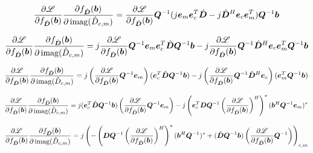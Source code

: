 \begin{appendices}
\begin{equation}
\frac{\partial \mathscr{L}}{\partial f_{\hat{\bm{D}}}(\bm{b})}\frac{\partial f_{\hat{\bm{D}}}(\bm{b})}{\partial \operatorname{imag}(\hat{D}_{c,m})} = \frac{\partial \mathscr{L}}{\partial f_{\hat{\bm{D}}}(\bm{b})}\bm{Q}^{-1}(j\bm{e}_m\bm{e}_c^T\hat{\bm{D}} - j\hat{\bm{D}}^H\bm{e}_c\bm{e}_m^T)\bm{Q}^{-1}\bm{b}
\end{equation}

\begin{equation}
\frac{\partial \mathscr{L}}{\partial f_{\hat{\bm{D}}}(\bm{b})}\frac{\partial f_{\hat{\bm{D}}}(\bm{b})}{\partial \operatorname{imag}(\hat{D}_{c,m})} = j\frac{\partial \mathscr{L}}{\partial f_{\hat{\bm{D}}}(\bm{b})}\bm{Q}^{-1}\bm{e}_m\bm{e}_c^T\hat{\bm{D}}\bm{Q}^{-1}\bm{b} - j\frac{\partial \mathscr{L}}{\partial f_{\hat{\bm{D}}}(\bm{b})}\bm{Q}^{-1}\hat{\bm{D}}^H\bm{e}_c\bm{e}_m^T\bm{Q}^{-1}\bm{b}
\end{equation}

\begin{equation}
\frac{\partial \mathscr{L}}{\partial f_{\hat{\bm{D}}}(\bm{b})}\frac{\partial f_{\hat{\bm{D}}}(\bm{b})}{\partial \operatorname{imag}(\hat{D}_{c,m})} = j\left(\frac{\partial \mathscr{L}}{\partial f_{\hat{\bm{D}}}(\bm{b})}\bm{Q}^{-1}\bm{e}_m\right)(\bm{e}_c^T\hat{\bm{D}}\bm{Q}^{-1}\bm{b}) - j\left(\frac{\partial \mathscr{L}}{\partial f_{\hat{\bm{D}}}(\bm{b})}\bm{Q}^{-1}\hat{\bm{D}}^H\bm{e}_c\right)(\bm{e}_m^T\bm{Q}^{-1}\bm{b})
\end{equation}

\begin{equation}
\frac{\partial \mathscr{L}}{\partial f_{\hat{\bm{D}}}(\bm{b})}\frac{\partial f_{\hat{\bm{D}}}(\bm{b})}{\partial \operatorname{imag}(\hat{D}_{c,m})} = j(\bm{e}_c^T\hat{\bm{D}}\bm{Q}^{-1}\bm{b})\left(\frac{\partial \mathscr{L}}{\partial f_{\hat{\bm{D}}}(\bm{b})}\bm{Q}^{-1}\bm{e}_m\right) - j\left(\bm{e}_c^T\bm{D}\bm{Q}^{-1}\left(\frac{\partial \mathscr{L}}{\partial f_{\hat{\bm{D}}}(\bm{b})}\right)^H\right)^*(\bm{b}^H\bm{Q}^{-1}\bm{e}_m)^*
\end{equation}


\begin{equation}
\frac{\partial \mathscr{L}}{\partial f_{\hat{\bm{D}}}(\bm{b})}\frac{\partial f_{\hat{\bm{D}}}(\bm{b})}{\partial \operatorname{imag}(\hat{D}_{c,m})} = j\left(-\left(\bm{D}\bm{Q}^{-1}\left(\frac{\partial \mathscr{L}}{\partial f_{\hat{\bm{D}}}(\bm{b})}\right)^H\right)^*(\bm{b}^H\bm{Q}^{-1})^* + (\hat{\bm{D}}\bm{Q}^{-1}\bm{b})\left(\frac{\partial \mathscr{L}}{\partial f_{\hat{\bm{D}}}(\bm{b})}\bm{Q}^{-1}\right)\right)_{c,m}
\end{equation}




\end{appendices}
